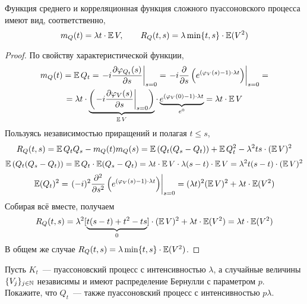 \begin{corollary}
    \label{corollary:special:compound_Poisson_process_moments}
    Функция среднего и корреляционная функция сложного пуассоновского процесса имеют вид, соответственно,
    \[
        m_Q(t) = \lambda t \cdot \operatorname{\mathbb{E}} V, \qquad
        R_Q(t, s) = \lambda \min\{t,s\} \cdot \operatorname{\mathbb{E}} (V^2)
    \]
\end{corollary}

\begin{proof}
    По свойству характеристической функции,
    \begin{multline*}
        m_Q(t) = \operatorname{\mathbb{E}} Q_t = \left . -i \frac{\partial \varphi_{Q_t}(s)}{\partial s} \right|_{s = 0} =
        \left. -i \frac{\partial}{\partial s} \left( e^{(\varphi_V(s) - 1) \cdot \lambda t} \right) \right|_{s = 0} = \\
        = \lambda t \cdot \underbrace{\left( \left. - i \frac{\partial \varphi_V(s)}{\partial s} \right|_{s = 0} \right)}_{\operatorname{\mathbb{E}} V} \cdot
            \underbrace{e^{(\varphi_V(0) - 1) \cdot \lambda t}}_{e^0} =
        \lambda t \cdot \operatorname{\mathbb{E}} V
    \end{multline*}
    Пользуясь независимостью приращений и полагая $ t \leqslant s $,
    \[
        R_Q(t,s) = \operatorname{\mathbb{E}} Q_t Q_s - m_Q(t) m_Q(s) = \operatorname{\mathbb{E}} \left( Q_t (Q_s - Q_t) \right) + \operatorname{\mathbb{E}} Q_t^2 - \lambda^2 t s \cdot (\operatorname{\mathbb{E}} V)^2
    \]
    \[
        \operatorname{\mathbb{E}} \left( Q_t (Q_s - Q_t) \right) = \operatorname{\mathbb{E}} Q_t \cdot \operatorname{\mathbb{E}} (Q_s - Q_t) = \lambda t \cdot \operatorname{\mathbb{E}} V \cdot \lambda (s - t) \cdot \operatorname{\mathbb{E}} V = \lambda^2 t (s - t) \cdot (\operatorname{\mathbb{E}} V)^2
    \]
    \[
        \operatorname{\mathbb{E}} (Q_t)^2 = \left. (- i)^2 \frac{\partial^2}{\partial s^2} \left( e^{(\varphi_V(s) - 1) \cdot \lambda t} \right) \right|_{s = 0} = (\lambda t)^2 (\operatorname{\mathbb{E}} V)^2 + \lambda t \cdot \operatorname{\mathbb{E}} (V^2)
    \]
    Собирая всё вместе, получаем
    \[
        R_Q(t,s) = \lambda^2 [ \underbrace{t(s - t) + t^2 - ts}_{0} ] \cdot (\operatorname{\mathbb{E}} V)^2 + \lambda t \cdot \operatorname{\mathbb{E}} (V^2) = \lambda t \cdot \operatorname{\mathbb{E}} (V^2)
    \]
    В общем же случае $ R_Q(t, s) = \lambda \min\{t,s\} \cdot \operatorname{\mathbb{E}} (V^2) $.
\end{proof}


\begin{Exercise}[counter=SecExercise, title={(Прореживание пуассоновского процесса)}]
    \noindent
    Пусть $ K_t $~--- пуассоновский процесс с интенсивностью $ \lambda $,
    а случайные величины $ \{V_j\}_{j \in \mathbb{N}} $ независимы и имеют распределение Бернулли с параметром $ p $.
    Покажите, что $ Q_t $~--- также пуассоновский процесс с интенсивностью $ p \lambda $.
\end{Exercise}

